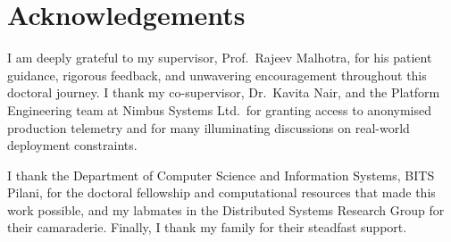 \chapter*{Acknowledgements}

\noindent I am deeply grateful to my supervisor, Prof.\ Rajeev Malhotra, for his patient guidance, rigorous feedback, and unwavering encouragement throughout this doctoral journey. I thank my co-supervisor, Dr.\ Kavita Nair, and the Platform Engineering team at Nimbus Systems Ltd.\ for granting access to anonymised production telemetry and for many illuminating discussions on real-world deployment constraints.

\noindent I thank the Department of Computer Science and Information Systems, BITS Pilani, for the doctoral fellowship and computational resources that made this work possible, and my labmates in the Distributed Systems Research Group for their camaraderie. Finally, I thank my family for their steadfast support.

\vspace{1.2cm}
\noindent\hfill \candidatename

\tableofcontents
\listoffigures
{}
\listoftables
{}
